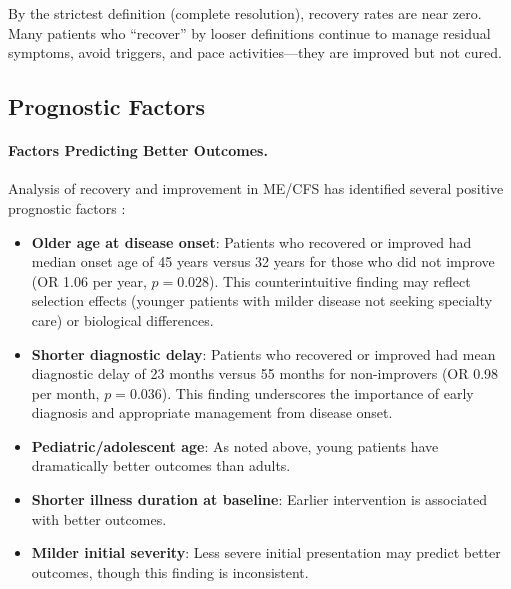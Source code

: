 By the strictest definition (complete resolution), recovery rates are near zero. Many patients who ``recover'' by looser definitions continue to manage residual symptoms, avoid triggers, and pace activities---they are improved but not cured.

\subsection{Prognostic Factors}

\paragraph{Factors Predicting Better Outcomes.}
Analysis of recovery and improvement in ME/CFS has identified several positive prognostic factors \cite{Lacourt2022prognosis}:

\begin{itemize}
    \item \textbf{Older age at disease onset}: Patients who recovered or improved had median onset age of 45 years versus 32 years for those who did not improve (OR 1.06 per year, $p = 0.028$). This counterintuitive finding may reflect selection effects (younger patients with milder disease not seeking specialty care) or biological differences.

    \item \textbf{Shorter diagnostic delay}: Patients who recovered or improved had mean diagnostic delay of 23 months versus 55 months for non-improvers (OR 0.98 per month, $p = 0.036$). This finding underscores the importance of early diagnosis and appropriate management from disease onset.

    \item \textbf{Pediatric/adolescent age}: As noted above, young patients have dramatically better outcomes than adults.

    \item \textbf{Shorter illness duration at baseline}: Earlier intervention is associated with better outcomes.

    \item \textbf{Milder initial severity}: Less severe initial presentation may predict better outcomes, though this finding is inconsistent.
\end{itemize}

